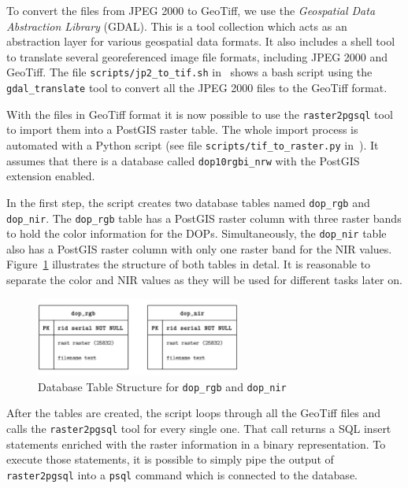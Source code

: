 To convert the files from JPEG 2000 to GeoTiff, we use the \emph{Geospatial Data Abstraction Library} (GDAL). This is a tool collection which acts as an abstraction layer for various geospatial data formats. It also includes a shell tool to translate several georeferenced image file formats, including JPEG 2000 and GeoTiff. The file \texttt{scripts/jp2\_to\_tif.sh} in~\cite{thesis-code20} shows a bash script using the \texttt{gdal\_translate} tool to convert all the JPEG 2000 files to the GeoTiff format.

With the files in GeoTiff format it is now possible to use the \texttt{raster2pgsql} tool to import them into a PostGIS raster table. The whole import process is automated with a Python script (see file \texttt{scripts/tif\_to\_raster.py} in~\cite{thesis-code20}). It assumes that there is a database called \texttt{dop10rgbi\_nrw} with the PostGIS extension enabled.

In the first step, the script creates two database tables named \texttt{dop\_rgb} and \texttt{dop\_nir}. The \texttt{dop\_rgb} table has a PostGIS raster column with three raster bands to hold the color information for the DOPs. Simultaneously, the \texttt{dop\_nir} table also has a PostGIS raster column with only one raster band for the NIR values. Figure~\ref{fig:dop_entities} illustrates the structure of both tables in detal. It is reasonable to separate the color and NIR values as they will be used for different tasks later on.

\begin{figure}[h]
    \centering
    \includegraphics[width=0.6\textwidth]{images/dop_entities}
    \caption{Database Table Structure for \texttt{dop\_rgb} and \texttt{dop\_nir}}
    \label{fig:dop_entities}
\end{figure}

After the tables are created, the script loops through all the GeoTiff files and calls the \texttt{raster2pgsql} tool for every single one. That call returns a SQL insert statements enriched with the raster information in a binary representation. To execute those statements, it is possible to simply pipe the output of \texttt{raster2pgsql} into a \texttt{psql} command which is connected to the database.

